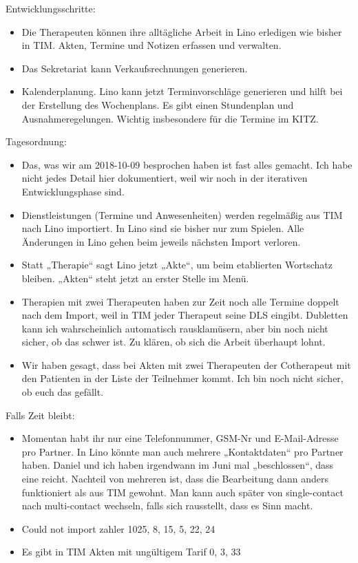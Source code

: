 \documentclass[letterpaper,10pt,ngerman]{sphinxmanual}
\begin{document}
Entwicklungsschritte:
\begin{itemize}
\item {} 
Die Therapeuten können ihre alltägliche Arbeit
in Lino erledigen wie bisher in TIM.
Akten, Termine und Notizen erfassen und
verwalten.

\item {} 
Das Sekretariat kann Verkaufsrechnungen generieren.

\item {} 
Kalenderplanung.  Lino kann jetzt Terminvorschläge generieren und
hilft bei der Erstellung des Wochenplans.  Es gibt einen Stundenplan
und Ausnahmeregelungen.  Wichtig insbesondere für die Termine im
KITZ.

\end{itemize}

Tagesordnung:
\begin{itemize}
\item {} 
Das, was wir am 2018-10-09 besprochen haben ist fast alles gemacht.
Ich habe nicht jedes Detail hier dokumentiert, weil wir noch in der
iterativen Entwicklungsphase sind.

\item {} 
Dienstleistungen (Termine und Anwesenheiten) werden regelmäßig aus
TIM nach Lino importiert.  In Lino sind sie bisher nur zum Spielen.
Alle Änderungen in Lino gehen beim jeweils nächsten Import verloren.

\item {} 
Statt „Therapie“ sagt Lino jetzt „Akte“, um beim etablierten
Wortschatz bleiben. „Akten“ steht jetzt an erster Stelle im Menü.

\item {} 
Therapien mit zwei Therapeuten haben zur Zeit noch alle Termine
doppelt nach dem Import, weil in TIM jeder Therapeut seine DLS
eingibt. Dubletten kann ich wahrscheinlich automatisch
rausklamüsern, aber bin noch nicht sicher, ob das schwer ist. Zu
klären, ob sich die Arbeit überhaupt lohnt.

\item {} 
Wir haben gesagt, dass bei Akten mit zwei Therapeuten der
Cotherapeut mit den Patienten in der Liste der Teilnehmer kommt.
Ich bin noch nicht sicher, ob euch das gefällt.

\end{itemize}

Falls Zeit bleibt:
\begin{itemize}
\item {} 
Momentan habt ihr nur eine Telefonnummer, GSM-Nr und E-Mail-Adresse
pro Partner. In Lino könnte man auch mehrere „Kontaktdaten“ pro
Partner haben. Daniel und ich haben irgendwann im Juni mal
„beschlossen“, dass eine reicht. Nachteil von mehreren ist, dass die
Bearbeitung dann anders funktioniert als aus TIM gewohnt. Man kann
auch später von single-contact nach multi-contact wechseln, falls
sich rausstellt, dass es Sinn macht.

\item {} 
Could not import zahler 1025, 8, 15, 5, 22, 24

\item {} 
Es gibt in TIM Akten mit ungültigem Tarif 0, 3, 33

\end{itemize}
\end{document}
